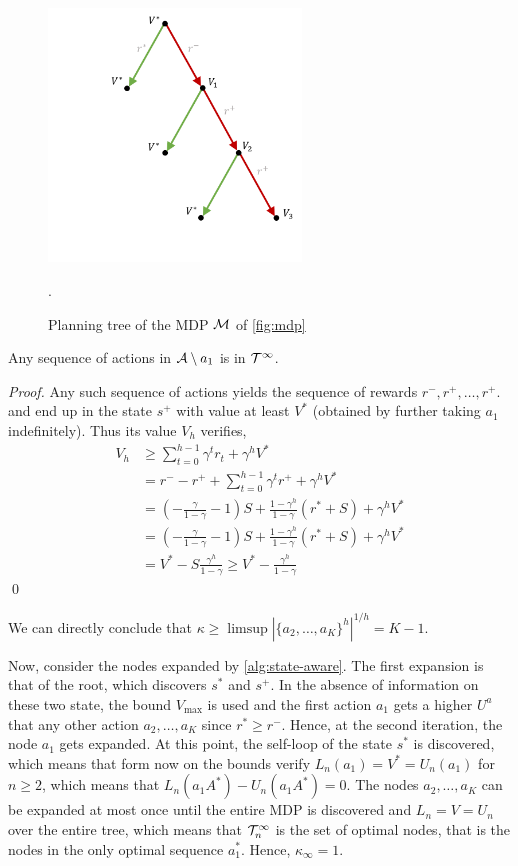 \documentclass[runningheads]{llncs}
\begin{document}
\begin{figure}
    \centering
    \includegraphics[trim={3.5cm 2cm 0.5cm 0.5cm}, clip, width=0.6\textwidth]{img/mdp_tree.pdf}
    \caption{Planning tree of the MDP $\mathcal{M}$ of \autoref{fig:mdp}}.
    \label{fig:mdp-tree}
\end{figure}
\begin{lemma}
 Any sequence of actions in $\mathcal{A}\setminus{a_1}$ is in $\mathcal{T}^\infty$.
\end{lemma}
\begin{proof}
Any such sequence of actions yields the sequence of rewards $r^-, r^+, \dots,r^+$. and end up in the state $s^+$ with value at least $V^*$ (obtained by further taking $a_1$ indefinitely). Thus its value $V_h$ verifies, 
\begin{align*}
    V_h &\geq \sum_{t=0}^{h-1} \gamma^t r_t + \gamma^h V^*\\
    &= r^- - r^+ + \sum_{t=0}^{h-1} \gamma^t r^+ + \gamma^h V^* \\
    &= (-\frac{\gamma}{1-\gamma} - 1)S + \frac{1-\gamma^h}{1-\gamma} (r^* + S) + \gamma^h V^*\\
    &= (-\frac{\gamma}{1-\gamma} - 1)S + \frac{1-\gamma^h}{1-\gamma} (r^* + S) + \gamma^h V^*\\
    &= V^* - S\frac{\gamma^h}{1-\gamma} \geq V^* - \frac{\gamma^h}{1-\gamma}
\end{align*}
\qed\end{proof}

We can directly conclude that $\kappa \geq \limsup{|\{a_2,\dots,a_K\}^h|^{1/h}} = K-1$.

Now, consider the nodes expanded by \autoref{alg:state-aware}. The first expansion is that of the root, which discovers $s^*$ and $s^+$. In the absence of information on these two state, the bound $V_{\max}$ is used and the first action $a_1$ gets a higher $U^a$ that any other action $a_2,\dots,a_K$ since $r^* \geq r^-$. Hence, at the second iteration, the node $a_1$ gets expanded. At this point, the self-loop of the state $s^*$ is discovered, which means that form now on the bounds verify $L_n(a_1) = V^* = U_n(a_1)$ for $n\geq2$, which means that $L_n(a_1A^*)-U_n(a_1A^*) = 0$. The nodes $a_2,\dots,a_K$ can be expanded at most once until the entire MDP is discovered and $L_n=V=U_n$ over the entire tree, which means that $\mathcal{T}_n^\infty$ is the set of optimal nodes, that is the nodes in the only optimal sequence $a_1^*$. Hence, $\kappa_\infty = 1.$ 
\end{document}
